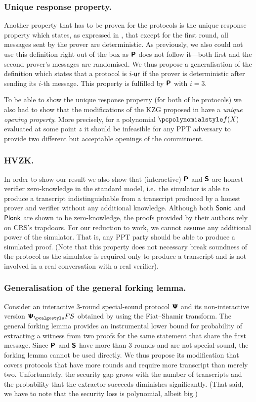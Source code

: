 \let\accentvec\vec \documentclass[runningheads,10pt]{llncs}
\begin{document}
\subsubsection{Unique response property.} Another property that
has to be proven for the protocols is the unique response property
which states, as expressed in \cite{C:Fischlin05}, that except for the first round, all messages sent
by the prover are deterministic. As previously, we also could not use this
definition right out of the box as $\bm{\mathsf{P}}$ does not follow it---both first
and the second prover's messages are randomised. We thus propose a
generalisation of the definition which states that a protocol is ${i\text{-}\mathsf{ur}}$ if the
prover is deterministic after sending its $i$-th message. This property is
fulfilled by $\bm{\mathsf{P}}$ with $i = 3$.

To be able to show the unique response property (for both of he protocols) we
also had to show that the modifications of the KZG \cite{AC:KatZavGol10}
proposed in \cite{EPRINT:GabWilCio19,CCS:MBKM19} have a \emph{unique opening
property}. More precisely, for a polynomial $\p{f}(X)$ evaluated at some
point $z$ it should be infeasible for any PPT adversary to provide
two different but acceptable openings of the commitment.

\subsubsection{HVZK.}%
In order to show our result we also show that (interactive) $\bm{\mathsf{P}}$ and
$\bm{\mathsf{S}}$ are
honest verifier zero-knowledge in the standard model, i.e.~the simulator is
able to produce a transcript indistinguishable from a transcript produced by a
honest prover and verifier without any additional knowledge.
Although both ${\textnormal{\textsf{Sonic}}}$ and $\textnormal{\textsf{Plonk}}$ are shown to be zero-knowledge, the proofs
provided by their authors rely on CRS's trapdoors. For our reduction to work,
we cannot assume any additional power of the simulator. That is, any PPT
party should be able to produce a simulated proof. (Note that this property
does not necessary break soundness of the protocol as the simulator is
required only to produce a transcript and is not involved in a real
conversation with a real verifier).

\subsubsection{Generalisation of the general forking lemma.}
Consider an interactive $3$-round special-sound protocol $\bm{\mathsf{\Psi}}$ and its
non-interactive version $\ps_\fs$ obtained by using the Fiat--Shamir
transform.  The general forking lemma provides an instrumental lower bound for
probability of extracting a witness from two proofs for the same statement
that share the first message.  Since $\bm{\mathsf{P}}$ and $\bm{\mathsf{S}}$ have more
than $3$ rounds and are not special-sound, the forking lemma cannot be used
directly. We thus propose its modification that covers protocols that have
more rounds and require more transcript than merely two.  Unfortunately, the
security gap grows with the number of transcripts and the probability that the
extractor succeeds diminishes significantly. (That said, we have to note that
the security loss is polynomial, albeit big.)
\end{document}

